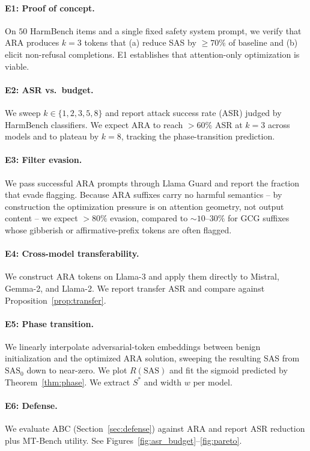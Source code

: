 \documentclass{article}
\theoremstyle{definition}
\theoremstyle{remark}
\newcommand{\SAS}{\mathrm{SAS}}
\begin{document}
\paragraph{E1: Proof of concept.} On $50$ HarmBench items and a single fixed safety system prompt, we verify that ARA produces $k{=}3$ tokens that (a) reduce SAS by $\geq 70\%$ of baseline and (b) elicit non-refusal completions. E1 establishes that attention-only optimization is viable.

\paragraph{E2: ASR vs.\ budget.} We sweep $k \in \{1,2,3,5,8\}$ and report attack success rate (ASR) judged by HarmBench classifiers. We expect ARA to reach $>60\%$ ASR at $k{=}3$ across models and to plateau by $k{=}8$, tracking the phase-transition prediction.

\paragraph{E3: Filter evasion.} We pass successful ARA prompts through Llama Guard \cite{inan2023llamaguard} and report the fraction that evade flagging. Because ARA suffixes carry no harmful semantics -- by construction the optimization pressure is on attention geometry, not output content -- we expect $>80\%$ evasion, compared to ${\sim}10$--$30\%$ for GCG suffixes whose gibberish or affirmative-prefix tokens are often flagged.

\paragraph{E4: Cross-model transferability.} We construct ARA tokens on Llama-3 and apply them directly to Mistral, Gemma-2, and Llama-2. We report transfer ASR and compare against Proposition~\ref{prop:transfer}.

\paragraph{E5: Phase transition.} We linearly interpolate adversarial-token embeddings between benign initialization and the optimized ARA solution, sweeping the resulting SAS from $\SAS_0$ down to near-zero. We plot $R(\SAS)$ and fit the sigmoid predicted by Theorem~\ref{thm:phase}. We extract $S^*$ and width $w$ per model.

\paragraph{E6: Defense.} We evaluate ABC (Section~\ref{sec:defense}) against ARA and report ASR reduction plus MT-Bench utility. See Figures~\ref{fig:asr_budget}--\ref{fig:pareto}.
\end{document}

